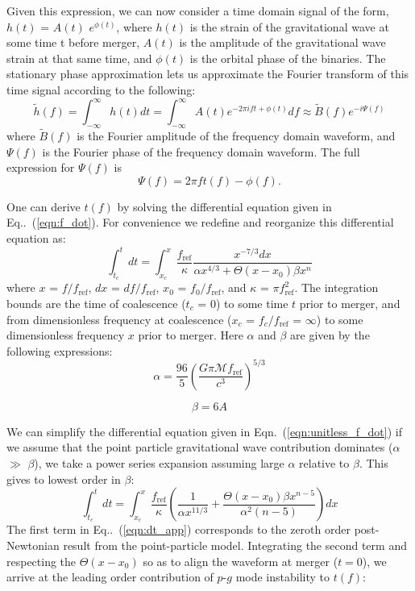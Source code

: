 Given this expression, we can now consider a time domain signal of the form, $h(t)$ = $A(t)$ $e^{\phi(t)}$, where $h(t)$ is the strain of the gravitational wave at some time t before merger, $A(t)$ is the amplitude of the gravitational wave strain at that same time, and $\phi(t)$ is the orbital phase of the binaries\cite{2008gravitational}. The stationary phase approximation lets us approximate the Fourier transform of this time signal according to the following:
\begin{equation}\label{eqn:SPA}
\tilde{h}(f) = \int_{-\infty}^{\infty} h(t) dt = \int_{-\infty}^{\infty} A(t) e^{-2\pi i ft + \phi(t)} df \approx \tilde{B}(f) e^{-i\Psi(f)}
\end{equation}
where $\tilde{B}(f)$ is the Fourier amplitude of the frequency domain waveform, and $\Psi(f)$ is the Fourier phase of the frequency domain waveform. The full expression for $\Psi(f)$ is
\begin{equation}\label{eqn:SPA_Phase}
\Psi(f) = 2\pi f t(f) - \phi(f).
\end{equation}

One can derive $t(f)$ by solving the differential equation given in Eq..~(\ref{eqn:f_dot}). For convenience we redefine and reorganize this differential equation as:
\begin{equation}\label{eqn:unitless_f_dot}
\int_{t_c}^t dt = \int_{x_c}^{x}  \frac{f_{\mathrm{ref}}}{\kappa} \frac{x^{-7/3} dx}{\alpha x^{4/3} +  \Theta(x - x_0) \beta x^n}
\end{equation}
where $x$ = $f / f_{\mathrm{ref}}$, $dx$ = $df / f_{\mathrm{ref}}$, $x_0$ = $f_0 / f_{\mathrm{ref}}$, and $\kappa$ = $\pi f_{\mathrm{ref}}^2$. The integration bounds are the time of coalescence ($t_c$ = 0) to some time $t$ prior to merger, and from dimensionless frequency at coalescence ($x_c$ = $f_c / f_{\mathrm{ref}}$ = $\infty$) to some dimensionless frequency $x$ prior to merger. Here $\alpha$ and $\beta$ are given by the following expressions:
\begin{equation}
\alpha = \frac{96}{5} \left ( \frac{G \pi \mathcal{M} f_{\mathrm{ref}}}{c^3} \right )^{5/3}
\end{equation}

\begin{equation}
\beta = 6 A
\end{equation}

We can simplify the differential equation given in Eqn.~(\ref{eqn:unitless_f_dot}) if we assume that the point particle gravitational wave contribution dominates ($\alpha$ $\gg$ $\beta$), we take a power series expansion assuming large $\alpha$ relative to $\beta$. This gives to lowest order in $\beta$:
\begin{equation}\label{eqn:dt_app}
\int_{t_c}^t dt = \int_{x_c}^{x} \frac{f_{\mathrm{ref}}}{\kappa} \left (\frac{1}{\alpha x^{11/3}} +  \frac{\Theta(x - x_0) \beta x^{n-5}}{\alpha^2 (n-5)} \right ) dx
\end{equation}
The first term in Eq..~(\ref{eqn:dt_app}) corresponds to the zeroth order post-Newtonian result from the point-particle model. Integrating the second term and respecting the $\Theta(x-x_0)$ so as to align the waveform at merger ($t=0$), we arrive at the leading order contribution of $p$-$g$ mode instability to $t(f)$:

